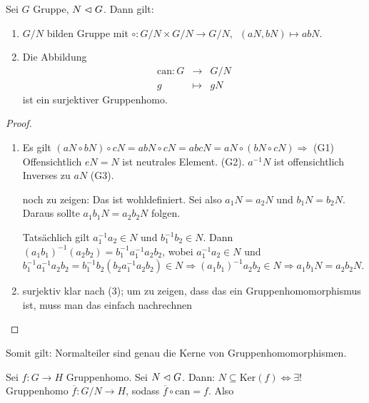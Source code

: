 \documentclass[12pt,a4paper]{scrartcl}
\begin{document}

\begin{satz}
	Sei $G$ Gruppe, $N\vartriangleleft G$. Dann gilt:\begin{enumerate}
		\item $G/N$ bilden Gruppe mit $\circ\colon G/N\times G/N \to G/N,\enspace (aN, bN)\mapsto abN$.
		\item Die Abbildung 
		\begin{eqnarray*}
			\mbox{can}\colon G &\to & G/N\\
			g&\mapsto& gN
		\end{eqnarray*}
	ist ein surjektiver Gruppenhomo.
	\end{enumerate}
\end{satz}

\begin{proof}
	\leavevmode
	\begin{enumerate}
		\item Es gilt $(aN\circ bN)\circ cN = abN\circ cN = abc N = aN\circ (bN\circ cN) \Rightarrow$ (G1)
		Offensichtlich $eN = N$ ist neutrales Element. (G2).
		$a^{-1}N$ ist offensichtlich Inverses zu $aN$ (G3).
		
		noch zu zeigen: Das ist wohldefiniert. Sei also $a_1N = a_2N$ und $b_1N = b_2N$. Daraus sollte $a_1b_1N = a_2b_2N$ folgen.
		
		Tatsächlich gilt $a_1^{-1}a_2 \in N$ und $b_1^{-1}b_2\in N$. Dann $(a_1b_1)^{-1}(a_2b_2) = b_1^{-1}a_1^{-1} a_2b_2$, wobei $a_1^{-1}a_2\in N$ und $b_1^{-1}a_1^{-1} a_2b_2 = b_1^{-1}b_2(b_2a_1^{-1}a_2b_2)\in N \Rightarrow (a_1b_1)^{-1}a_2b_2\in N\Rightarrow a_1b_1N = a_2b_2N$.
		
		\item surjektiv klar nach (3); um zu zeigen, dass das ein Gruppenhomomorphismus ist, muss man das einfach nachrechnen
	\end{enumerate}
\end{proof}

\begin{bem}
	Somit gilt: Normalteiler sind genau die Kerne von Gruppenhomomorphismen.
\end{bem}

\begin{satz}[Homomorphiesatz]
	Sei $f\colon G\to H$ Gruppenhomo. Sei $N\vartriangleleft G$. Dann: $N\subseteq \mbox{Ker}(f)\Leftrightarrow \exists!$ Gruppenhomo $\overline{f}\colon G/N\to H$, sodass $\overline{f}\circ \mbox{can} = f$. Also 
	
\end{satz}
\end{document}

